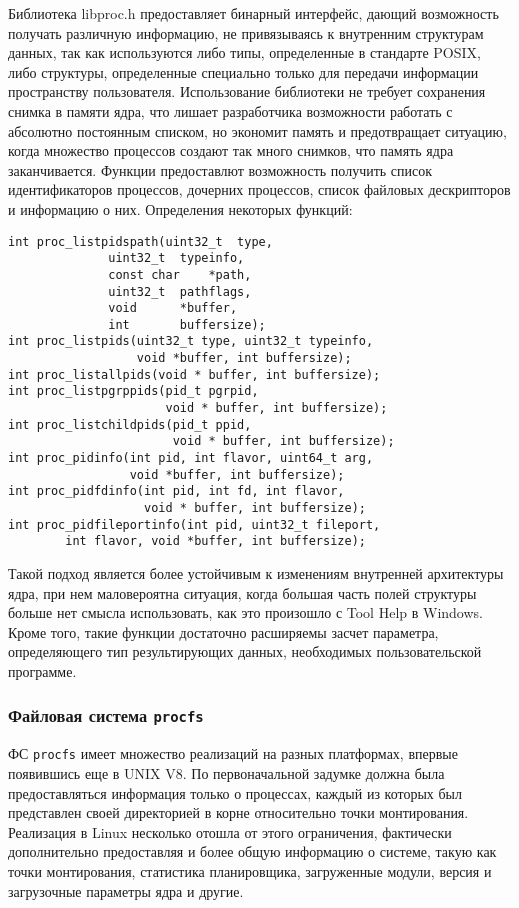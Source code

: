 Библиотека libproc.h предоставляет бинарный интерфейс, дающий возможность получать
различную информацию, не привязываясь к внутренним структурам данных, так как
используются либо типы, определенные в стандарте POSIX, либо структуры,
определенные специально только для передачи информации пространству
пользователя\cite{libproc}. Использование библиотеки не требует сохранения
снимка в памяти ядра, что лишает разработчика возможности работать с абсолютно
постоянным списком, но экономит память и предотвращает ситуацию, когда множество
процессов создают так много снимков, что память ядра заканчивается. Функции
предоставлют возможность получить список идентификаторов процессов, дочерних
процессов, список файловых дескрипторов и информацию о них. Определения
некоторых функций:

\medskip
\begin{lstlisting}[style=cstyle]
int	proc_listpidspath(uint32_t	type,
			  uint32_t	typeinfo,
			  const char	*path,
			  uint32_t	pathflags,
			  void		*buffer,
			  int		buffersize);
int proc_listpids(uint32_t type, uint32_t typeinfo,
                  void *buffer, int buffersize);
int proc_listallpids(void * buffer, int buffersize);
int proc_listpgrppids(pid_t pgrpid,
                      void * buffer, int buffersize);
int proc_listchildpids(pid_t ppid,
                       void * buffer, int buffersize);
int proc_pidinfo(int pid, int flavor, uint64_t arg,
                 void *buffer, int buffersize);
int proc_pidfdinfo(int pid, int fd, int flavor,
                   void * buffer, int buffersize);
int proc_pidfileportinfo(int pid, uint32_t fileport,
        int flavor, void *buffer, int buffersize);
\end{lstlisting}
\medskip

Такой подход является более устойчивым к изменениям внутренней архитектуры ядра,
при нем маловероятна ситуация, когда большая часть полей структуры больше нет
смысла использовать, как это произошло с Tool Help в Windows. Кроме того, такие
функции достаточно расширяемы засчет параметра, определяющего тип результирующих
данных, необходимых пользовательской программе.

\subsubsection{Файловая система \texttt{procfs}}
\label{sub:domain:analogs:procfs}

ФС \texttt{procfs} имеет множество реализаций на разных платформах, впервые
появившись еще в UNIX V8. По первоначальной задумке должна была предоставляться
информация только о процессах, каждый из которых был представлен своей
директорией в корне относительно точки монтирования. Реализация в Linux
несколько отошла от этого ограничения, фактически дополнительно предоставляя и
более общую информацию о системе, такую как точки монтирования, статистика
планировщика, загруженные модули, версия и загрузочные параметры ядра и
другие\cite{rlove}.

